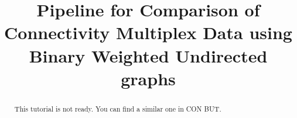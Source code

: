\documentclass[justified]{tufte-handout}
\title{Pipeline for Comparison of Connectivity Multiplex Data using Binary Weighted Undirected graphs}
\begin{document}
\maketitle

\begin{abstract}
\noindent
This tutorial is not ready. You can find a similar one in CON BUT.
\end{abstract}
\end{document}
